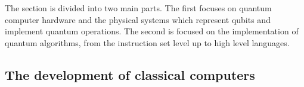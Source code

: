 The section is divided into two main parts. The first focuses on quantum computer hardware and the physical systems which represent qubits and implement quantum operations. The second is focused on the implementation of quantum algorithms, from the instruction set level up to high level languages.

\subsection{The development of classical computers}

